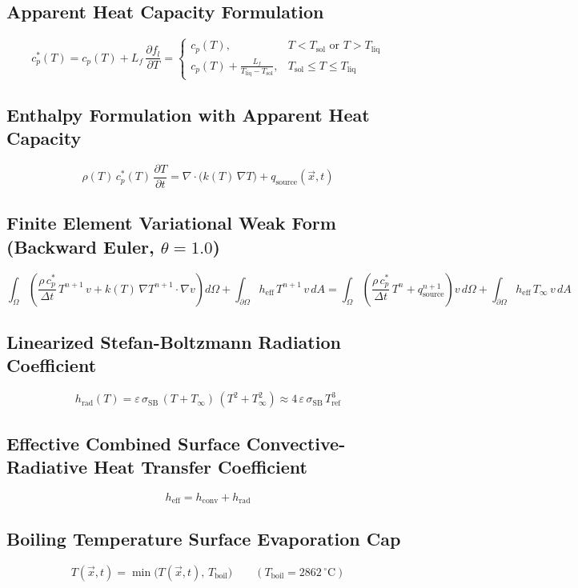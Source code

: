 \documentclass[10pt,a4paper]{article}
\begin{document}
\subsection*{Apparent Heat Capacity Formulation}
\[
c_p^*(T) = c_p(T) + L_f\,\frac{\partial f_l}{\partial T} = \begin{cases}
c_p(T), & T < T_{\mathrm{sol}} \text{ or } T > T_{\mathrm{liq}} \\[4pt]
\displaystyle c_p(T) + \frac{L_f}{T_{\mathrm{liq}} - T_{\mathrm{sol}}}, & T_{\mathrm{sol}} \le T \le T_{\mathrm{liq}}
\end{cases}
\]

\subsection*{Enthalpy Formulation with Apparent Heat Capacity}
\[
\rho(T)\,c_p^*(T)\,\frac{\partial T}{\partial t} = \nabla \cdot \bigl(k(T)\,\nabla T\bigr) + q_{\mathrm{source}}(\vec{x}, t)
\]

\subsection*{Finite Element Variational Weak Form (Backward Euler, $\theta = 1.0$)}
\[
\int_{\Omega} \left( \frac{\rho\,c_p^*}{\Delta t}\,T^{n+1}\,v + k(T)\,\nabla T^{n+1} \cdot \nabla v \right) d\Omega + \int_{\partial\Omega} h_{\mathrm{eff}}\,T^{n+1}\,v\,dA = \int_{\Omega} \left( \frac{\rho\,c_p^*}{\Delta t}\,T^n + q_{\mathrm{source}}^{n+1} \right) v\,d\Omega + \int_{\partial\Omega} h_{\mathrm{eff}}\,T_\infty\,v\,dA
\]

\subsection*{Linearized Stefan-Boltzmann Radiation Coefficient}
\[
h_{\mathrm{rad}}(T) = \varepsilon\,\sigma_{\mathrm{SB}}\,(T + T_\infty)\,(T^2 + T_\infty^2) \approx 4\,\varepsilon\,\sigma_{\mathrm{SB}}\,T_{\mathrm{ref}}^3
\]

\subsection*{Effective Combined Surface Convective-Radiative Heat Transfer Coefficient}
\[
h_{\mathrm{eff}} = h_{\mathrm{conv}} + h_{\mathrm{rad}}
\]

\subsection*{Boiling Temperature Surface Evaporation Cap}
\[
T(\vec{x}, t) = \min\bigl(T(\vec{x}, t),\,T_{\mathrm{boil}}\bigr) \qquad (T_{\mathrm{boil}} = 2862\,^\circ\mathrm{C})
\]
\end{document}

